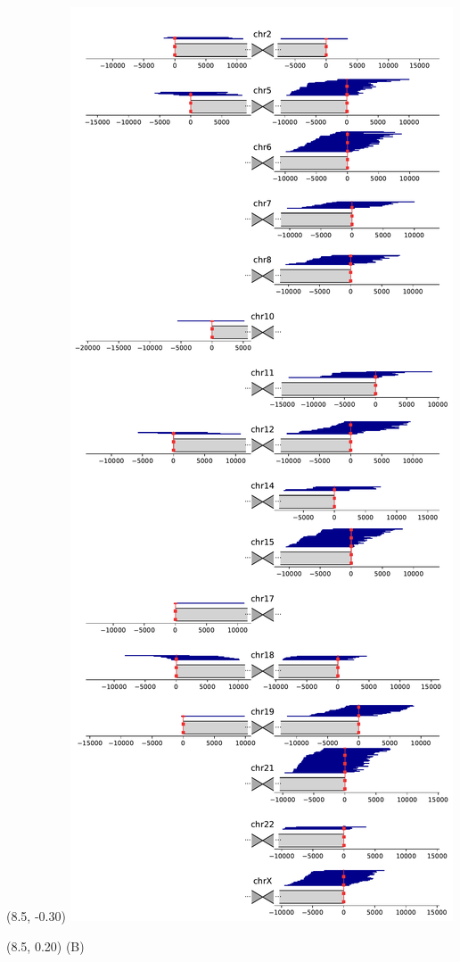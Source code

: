 \documentclass{article}
\begin{document}
\begin{textblock}{13}(8.5,  -0.30) \includegraphics{assets/HG005-alignment.pdf}   \end{textblock}
\begin{textblock}{13}(8.5,  0.20) \Huge{(B)} \end{textblock}
\end{document}
